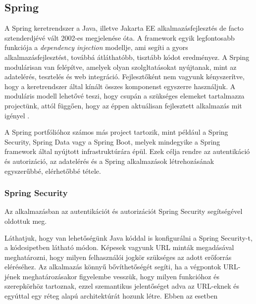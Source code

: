 \subsection{Spring}

A Spring keretrendszer a Java, illetve Jakarta EE alkalmazásfejlesztés de facto sztenderdjévé vált 2002-es megjelenése óta. A framework egyik legfontosabb funkciója a \emph{dependency injection} modellje, ami segíti a gyors alkalmazásfejlesztést, továbbá átláthatóbb, tisztább kódot eredményez. A Srping modulárisan van felépítve, amelyek olyan szolgltatásokat nyújtanak, mint az adatelérés, tesztelés és web integráció. Fejlesztőként nem vagyunk kényszerítve, hogy a keretrendszer által kínált összes komponenst egyszerre használjuk. A moduláris modell lehetővé teszi, hogy csupán a szükséges elemeket tartalmazza projectünk, attól függően, hogy az éppen aktuálisan fejlesztett alkalmazás mit igényel \cite{buildingSpringRest}.\par

A Spring portfólióhoz számos más project tartozik, mint például a Spring Security, Spring Data vagy a Spring Boot, melyek mindegyike a Spring framework által nyújtott infrastruktúrára épül. Ezek célja rendre az autentikáció és autorizáció, az adatelérés és a Spring alkalmazások létrehozásának egyszerűbbé, elérhetőbbé tétele. \par

\subsubsection{Spring Security}

Az alkalmazásban az autentikációt és autorizációt Spring Security segítségével oldottuk meg.


Láthatjuk, hogy van lehetőségünk Java kóddal is konfigurálni a Spring Security-t, a kódcsipetben látható módon. Képesek vagyunk URL minták megadásával meghatározni, hogy milyen felhasználói jogkör szükséges az adott erőforrás eléréséhez. Az alkalmazás könnyű bővíthetőségét segíti, ha a végpontok URL-jének meghatározásakor figyelembe vesszük, hogy milyen funkcióhoz és szerepkörhöz tartoznak, ezzel szemantikus jelentőséget adva az URL-eknek és egyúttal egy réteg alapú architektúrát hozunk létre. Ebben az esetben


